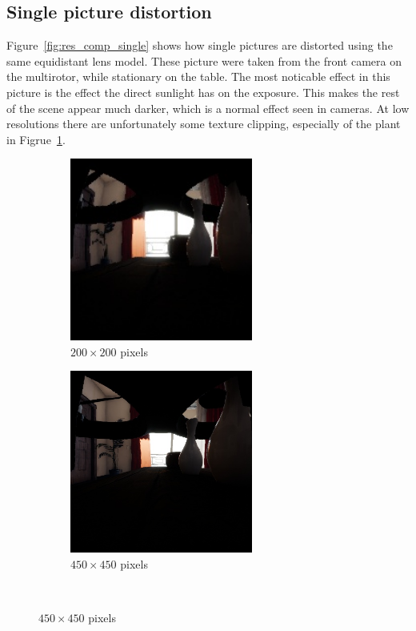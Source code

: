\subsection{Single picture distortion}

Figure~\ref{fig:res_comp_single} shows how single pictures are distorted using the same equidistant lens model. These picture were taken from the front camera on the multirotor, while stationary on the table. The most noticable effect in this picture is the effect the direct sunlight has on the exposure. This makes the rest of the scene appear much darker, which is a normal effect seen in cameras. At low resolutions there are unfortunately some texture clipping, especially of the plant in Figrue~\ref{fig:res_comp_single_256_200}.

\begin{figure}[!htb]
    \centering
    \begin{subfigure}{0.45\textwidth}
        \centering
        \includegraphics[height=6cm]{rapport/fig/Results/single/single_256_200.jpeg}
        \caption{$200 \times 200$ pixels}
        \label{fig:res_comp_single_256_200}
    \end{subfigure}
    \begin{subfigure}{0.45\textwidth}
        \centering
        \includegraphics[height=6cm]{rapport/fig/Results/single/single_512_450.jpeg}
        \caption{$450 \times 450$ pixels}
        \label{fig:res_comp_single_512_450}
    \end{subfigure} \\


\end{figure}
